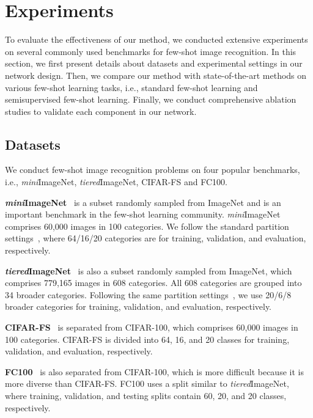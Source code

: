 \documentclass{SCIS2019}
\begin{document}
\section{Experiments}
To evaluate the effectiveness of our method, we conducted extensive experiments on several commonly used benchmarks for few-shot image recognition. In this section, we first present details about datasets and experimental settings in our network design. Then, we compare our method with state-of-the-art methods on various few-shot learning tasks, i.e., standard few-shot learning and semisupervised few-shot learning. Finally, we conduct comprehensive ablation studies to validate each component in our network.

\subsection{Datasets}
We conduct few-shot image recognition problems on four popular benchmarks, i.e., \emph{mini}ImageNet, \emph{tiered}ImageNet, CIFAR-FS and FC100.

\textbf{\emph{mini}ImageNet}~\cite{6} is a subset randomly sampled from ImageNet and is an important benchmark in the few-shot learning community. \emph{mini}ImageNet comprises 60,000 images in 100 categories. We follow the standard partition settings~\cite{7}, where 64/16/20 categories are for training, validation, and evaluation, respectively.

\textbf{\emph{tiered}ImageNet}~\cite{22} is also a subset randomly sampled from ImageNet, which comprises 779,165 images in 608 categories. All 608 categories are grouped into
34 broader categories. Following the same partition settings~\cite{14}, we use 20/6/8 broader categories for training, validation, and evaluation, respectively.

\textbf{CIFAR-FS}~\cite{23} is separated from CIFAR-100, which comprises 60,000 images in 100 categories. CIFAR-FS is divided into 64, 16, and 20 classes for training, validation, and evaluation, respectively.

\textbf{FC100}~\cite{24} is also separated from CIFAR-100, which is more difficult because it is more diverse than CIFAR-FS. FC100 uses a split similar to \emph{tiered}ImageNet, where training, validation, and testing splits contain 60, 20, and 20 classes, respectively.
\end{document}
